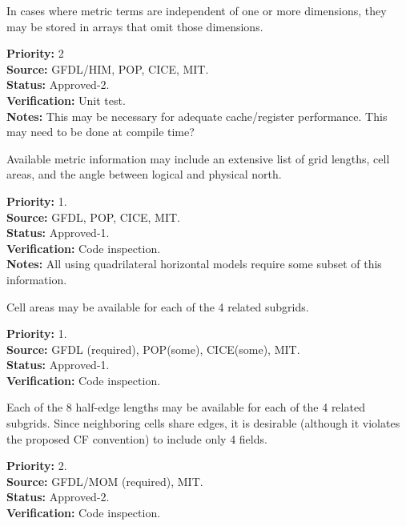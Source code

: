 In cases where metric terms are independent of one or more dimensions, they may be
stored in arrays that omit those dimensions.
\begin{reqlist}
{\bf Priority:} 2 \\
{\bf Source:} GFDL/HIM, POP, CICE, MIT. \\
{\bf Status:} Approved-2. \\
{\bf Verification:} Unit test. \\
{\bf Notes:} This may be necessary for adequate cache/register performance.  This may
need to be done at compile time?
\end{reqlist}

Available metric information may include an extensive list of grid lengths, cell
areas, and the angle between logical and physical north.
\begin{reqlist}
{\bf Priority:} 1. \\
{\bf Source:} GFDL, POP, CICE, MIT. \\
{\bf Status:} Approved-1. \\
{\bf Verification:} Code inspection. \\
{\bf Notes:} All using quadrilateral horizontal models require some subset of this information.
\end{reqlist}

Cell areas may be available for each of the 4 related subgrids.
\begin{reqlist}
{\bf Priority:} 1. \\
{\bf Source:} GFDL (required), POP(some), CICE(some), MIT. \\
{\bf Status:} Approved-1. \\
{\bf Verification:} Code inspection.
\end{reqlist}

Each of the 8 half-edge lengths may be available for each of the 4 related
subgrids.  Since neighboring cells share edges, it is desirable (although it violates
the proposed CF convention) to include only 4 fields.
\begin{reqlist}
{\bf Priority:} 2. \\
{\bf Source:} GFDL/MOM (required), MIT. \\
{\bf Status:} Approved-2. \\
{\bf Verification:} Code inspection.
\end{reqlist}

